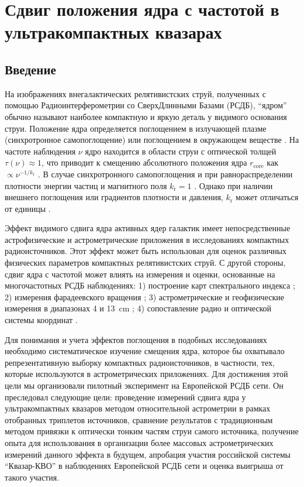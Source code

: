 \graphicspath{{Dissertation/images/chapt1/}}


\chapter{Сдвиг положения ядра с частотой в ультракомпактных квазарах} \label{chapt1}


\section{Введение}

На изображениях внегалактических релятивистских струй, полученных с помощью Радиоинтерферометрии со
СверхДлинными Базами (РСДБ), ``ядром'' обычно называют наиболее компактную и яркую деталь у видимого
основания струи. Положение ядра определяется поглощением в излучающей плазме (синхротронное
самопоглощение) или поглощением в окружающем веществе
\cite{Blandford_Konigl_1979,Konigl_1981,Lobanov_1998}. На частоте наблюдения $\nu$ ядро находится в
области струи с оптической толщей $\tau(\nu) \approx 1$, что приводит к смещению абсолютного
положения ядра $r_\mathrm{core}$ как $\propto \nu^{-1/k_{\mathrm{r}}}$ \cite{Lobanov_1998}. В случае
синхротронного самопоглощения и при равнораспределении плотности энергии частиц и магнитного поля
$k_\mathrm{r} = 1$ \cite{Blandford_Konigl_1979}. Однако при наличии внешнего поглощения или
градиентов плотности и давления, $k_\mathrm{r}$ может отличаться от единицы \cite{Lobanov_1998}.

Эффект видимого сдвига ядра активных ядер галактик имеет непосредственные астрофизические и
астрометрические приложения в исследованиях компактных радиоисточников. Этот эффект может быть
использован для оценок различных физических параметров компактных релятивистских струй. С другой
стороны, сдвиг ядра с частотой может влиять на измерения и оценки, основанные на многочастотных РСДБ
наблюдениях: 1) построение карт спектрального индекса \cite{Lobanov_1998,Kovalev_2008}; 2) измерения
фарадеевского вращения \cite{Hovatta_2012,Krav2016,Krav2017}; 3) астрометрические и геофизические
измерения в диапазонах \num{4} и \SI{13}{\cm} \cite{Ma_1998,Petrov2009}; 4) сопоставление радио и
оптической системы координат \cite{PK_letter2017,KPP2017,PK2017}.

Для понимания и учета эффектов поглощения в подобных исследованиях необходимо систематическое
изучение смещения ядра, которое бы охватывало репрезентативную выборку компактных радиоисточников, в
частности, тех, которые используются в астрометрических приложениях. Для достижения этой цели мы
организовали пилотный эксперимент на Европейской РСДБ сети. Он преследовал следующие цели:
проведение измерений сдвига ядра у ультракомпактных квазаров методом относительной астрометрии в
рамках отобранных триплетов источников, сравнение результатов с традиционным методом
привязки к оптически тонким частям струи самого источника, получение опыта для использования в
организации более массовых астрометрических измерений данного эффекта в будущем, апробация участия
российской системы ``Квазар-КВО'' в наблюдениях Европейской РСДБ сети и оценка выигрыша от такого
участия.

